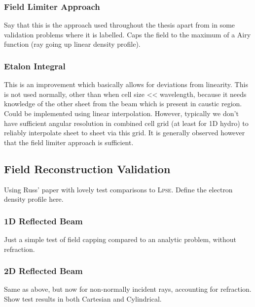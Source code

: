 \subsubsection{Field Limiter Approach}
Say that this is the approach used throughout the thesis apart from in some validation problems where it is labelled.
Caps the field to the maximum of a Airy function (ray going up linear density profile).

\subsubsection{Etalon Integral}
This is an improvement which basically allows for deviations from linearity.
This is not used normally, other than when cell size << wavelength, because it needs knowledge of the other sheet from the beam which is present in caustic region.
Could be implemented using linear interpolation.
However, typically we don't have sufficient angular resolution in combined cell grid (at least for 1D hydro) to reliably interpolate sheet to sheet via this grid.
It is generally observed however that the field limiter approach is sufficient.

\subsection{Field Reconstruction Validation}
Using Russ' paper with lovely test comparisons to \textsc{Lpse}.
Define the electron density profile here.

\subsubsection{1D Reflected Beam}
Just a simple test of field capping compared to an analytic problem, without refraction.

\subsubsection{2D Reflected Beam}
Same as above, but now for non-normally incident rays, accounting for refraction.
Show test results in both Cartesian and Cylindrical.


